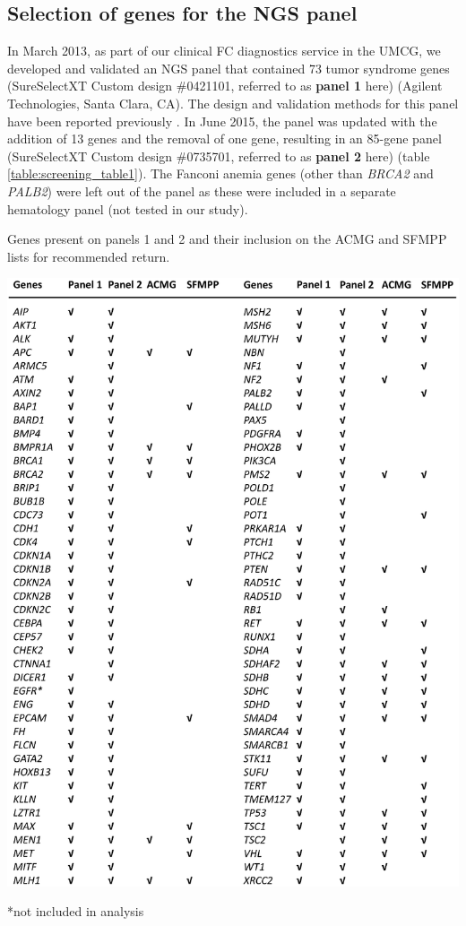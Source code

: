 \subsection{Selection of genes for the NGS panel}
In March 2013, as part of our clinical FC diagnostics service in the UMCG, we developed and validated an NGS panel that contained 73 tumor syndrome genes (SureSelectXT Custom design \#0421101, referred to as \textbf{panel 1} here) (Agilent Technologies, Santa Clara, CA). 
The design and validation methods for this panel have been reported previously \cite{Sikkema_Raddatz_2013}. 
In June 2015, the panel was updated with the addition of 13 genes and the removal of one gene, resulting in an 85-gene panel (SureSelectXT Custom design \#0735701, referred to as \textbf{panel 2} here) (table \ref{table:screening_table1}).
The Fanconi anemia genes (other than \textsl{BRCA2} and \textsl{PALB2}) were left out of the panel as these were included in a separate hematology panel (not tested in our study). 

\begin{table}
\caption[Panel 1 and 2 genes and ACMG and SFMPP inclusion]{Genes present on panels 1 and 2 and their inclusion on the ACMG and SFMPP lists for recommended return.}
\includegraphics[width=1.0\linewidth]{img/opportunistic_screening_Table1}
 \caption*{\footnotesize{*not included in analysis}}
\label{table:screening_table1}
\end{table}

